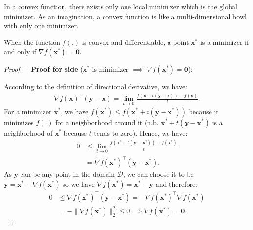 \documentclass[lang=cn,10pt]{gorgeousnbook}
\numberwithin{equation}{section}%
\numberwithin{figure}{section}%
\begin{document}
\begin{corollary}\label{corollary_only_one_min_convex_function}
In a convex function, there exists only one local minimizer which is the global minimizer. As an imagination, a convex function is like a multi-dimensional bowl with only one minimizer. 
\end{corollary}

\begin{lemma}\label{lemma_minimizer_gradient_zero}
When the function $f(.)$ is convex and differentiable, a point $\boldsymbol{x}^*$ is a minimizer if and only if $\nabla f(\boldsymbol{x}^*) = \boldsymbol{0}$.
\end{lemma}
\begin{proof}
\textbf{-- Proof for side} ($\boldsymbol{x}^*$ is minimizer $\implies$ $\nabla f(\boldsymbol{x}^*) = \boldsymbol{0}$):

According to the definition of directional derivative, we have:
\begin{align*}
\nabla f(\boldsymbol{x})^\top (\boldsymbol{y} - \boldsymbol{x}) = \lim_{t \rightarrow 0} \frac{f(\boldsymbol{x} + t(\boldsymbol{y} - \boldsymbol{x})) - f(\boldsymbol{x})}{t}.
\end{align*}
For a minimizer $\boldsymbol{x}^*$, we have $f(\boldsymbol{x}^*) \leq f(\boldsymbol{x}^* + t(\boldsymbol{y} - \boldsymbol{x}^*))$ because it minimizes $f(.)$ for a neighborhood around it (n.b. $\boldsymbol{x}^* + t(\boldsymbol{y} - \boldsymbol{x}^*)$ is a neighborhood of $\boldsymbol{x}^*$ because $t$ tends to zero). Hence, we have:
\begin{align*}
0 &\leq \lim_{t \rightarrow 0} \frac{f(\boldsymbol{x}^* + t(\boldsymbol{y} - \boldsymbol{x}^*)) - f(\boldsymbol{x}^*)}{t} \\
&= \nabla f(\boldsymbol{x}^*)^\top (\boldsymbol{y} - \boldsymbol{x}^*).
\end{align*}
As $\boldsymbol{y}$ can be any point in the domain $\mathcal{D}$, we can choose it to be $\boldsymbol{y} = \boldsymbol{x}^* - \nabla f(\boldsymbol{x}^*)$ so we have $\nabla f(\boldsymbol{x}^*) = \boldsymbol{x}^* - \boldsymbol{y}$ and therefore:
\begin{align*}
0 &\leq \nabla f(\boldsymbol{x}^*)^\top (\boldsymbol{y} - \boldsymbol{x}^*) = - \nabla f(\boldsymbol{x}^*)^\top \nabla f(\boldsymbol{x}^*) \\
&= - \|\nabla f(\boldsymbol{x}^*)\|_2^2 \leq 0 \implies \nabla f(\boldsymbol{x}^*) = \boldsymbol{0}. 
\end{align*}


\end{proof}
\end{document}
